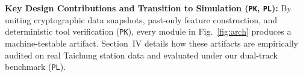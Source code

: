 \textbf{Key Design Contributions and Transition to Simulation (\texttt{PK}, \texttt{PL}):} By uniting cryptographic data snapshots, past-only feature construction, and deterministic tool verification (\texttt{PK}), every module in Fig.~\ref{fig:arch} produces a machine-testable artifact. Section~IV details how these artifacts are empirically audited on real Taichung station data and evaluated under our dual-track benchmark (\texttt{PL}).

